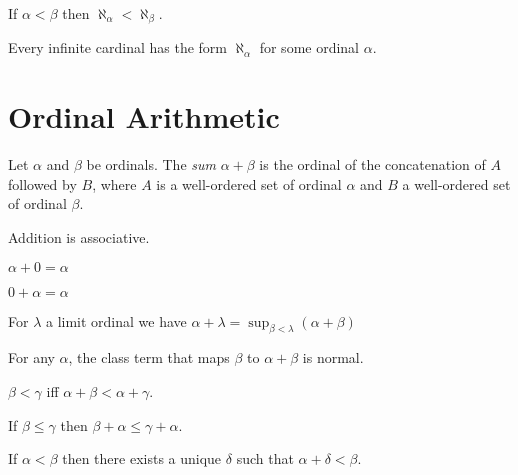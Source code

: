 \begin{theorem}
    If $\alpha < \beta$ then $\aleph_\alpha < \aleph_\beta$.
\end{theorem}

\begin{theorem}
    Every infinite cardinal has the form $\aleph_\alpha$
    for some ordinal $\alpha$.
\end{theorem}

\section{Ordinal Arithmetic}

\begin{definition}[Sum]
    Let $\alpha$ and $\beta$ be ordinals. The \emph{sum}
$\alpha + \beta$ is the ordinal of the concatenation of $A$
followed by $B$, where $A$ is a well-ordered set of ordinal $\alpha$
and $B$ a well-ordered set of ordinal $\beta$.
\end{definition}

\begin{theorem}
    Addition is associative.
\end{theorem}

\begin{theorem}
    $\alpha + 0 = \alpha$
\end{theorem}

\begin{theorem}
    $0 + \alpha = \alpha$
\end{theorem}

\begin{theorem}
    For $\lambda$ a limit ordinal we have $\alpha + \lambda = \sup_{\beta < \lambda} (\alpha + \beta)$
\end{theorem}

\begin{theorem}
    For any $\alpha$, the class term that maps $\beta$ to $\alpha + \beta$ is normal.
\end{theorem}

\begin{theorem}
    $\beta < \gamma$ iff $\alpha + \beta < \alpha + \gamma$.
\end{theorem}

\begin{theorem}
    If $\beta \leq \gamma$ then $\beta + \alpha \leq \gamma + \alpha$.
\end{theorem}

\begin{theorem}
    If $\alpha < \beta$ then there exists a unique $\delta$ such that $\alpha + \delta < \beta$.
\end{theorem}


